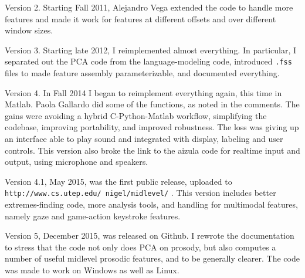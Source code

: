 \documentclass[11pt]{article}
\begin{document}
Version 2. Starting Fall 2011, Alejandro Vega extended the code to
handle more features and made it work for features at different
offsets and over different window sizes.

Version 3. Starting late 2012, I reimplemented almost everything.  In
particular, I separated out the PCA code from the language-modeling
code, introduced {\tt .fss} files to made feature assembly
parameterizable, and documented everything.  

Version 4.  In Fall 2014 I began to reimplement everything again, this
time in Matlab.  Paola Gallardo did some of the functions, as noted in
the comments.  The gains were avoiding a hybrid C-Python-Matlab
workflow, simplifying the codebase, improving portability, and
improved robustness.  The loss was giving up an interface able to play
sound and integrated with display, labeling and user controls.  This
version also broke the link to the aizula code for realtime input and
output, using microphone and speakers.

Version 4.1, May 2015, was the first public release, uploaded to {\tt
  http://www.cs.utep.edu/ nigel/midlevel/} .  This version includes
better extremes-finding code, more analysis tools, and handling for
multimodal features, namely gaze and game-action keystroke features.

Version 5, December 2015, was released on Github.  I rewrote the
documentation to stress that the code not only does PCA on prosody,
but also computes a number of useful midlevel prosodic features, and
to be generally clearer.  The code was made to work on Windows as well
as Linux.
\end{document}
